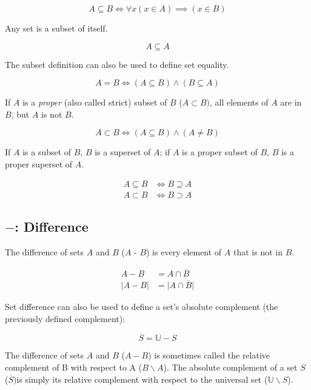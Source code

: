 \documentclass{report}
\begin{document}
\begin{equation}
    A \subseteq B \iff \forall x (x \in A) \implies (x \in B)
\end{equation}

Any set is a subset of itself.

\begin{equation}
    A \subseteq A
\end{equation}

The subset definition can also be used to define set equality.

\begin{equation}
    A = B \iff (A \subseteq B) \land (B \subseteq A)
\end{equation}

If $A$ is a \emph{proper} (also called strict) subset of $B$ ($A \subset B)$,
all elements of $A$ are in $B$, but $A$ is not $B$.

\begin{equation}
    A \subset B \iff (A \subseteq B) \land (A  \not= B)
\end{equation}

If $A$ is a subset of $B$, $B$ is a superset of $A$; if $A$ is a proper subset of $B$, $B$ is a proper superset of $A$.

\begin{align}
    A \subseteq B &\iff B \supseteq A \\
    A \subset B &\iff B \supset A
\end{align}

\subsection{$-$: Difference}

The difference of sets $A$ and $B$ ($A$ - $B$) is every element of $A$ that is not in $B$.

\begin{align}
    A - B &= A \cap \overline{B} \\
    \vert A - B \vert &= \vert A \cap \overline{B} \vert
\end{align}

Set difference can also be used to define a set's absolute complement (the previously defined complement):

\begin{equation}
    \overline{S} = \mathbb{U} - S
\end{equation}

The difference of sets $A$ and $B$ ($A - B$) is sometimes called the relative complement of B with respect to A ($B \backslash A$). The absolute complement of a set $S$  ($\overline{S}) $is simply its relative complement with respect to the universal set ($\mathbb{U} \backslash {S}$).
\end{document}

